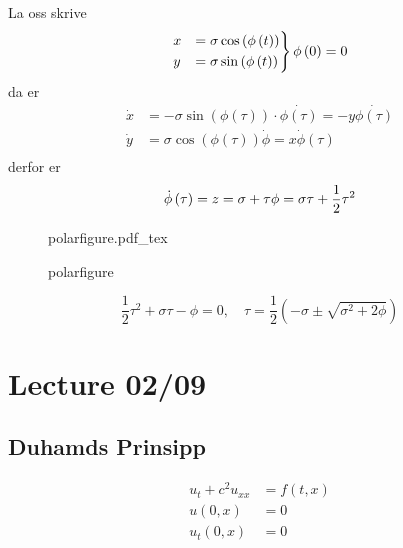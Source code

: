 \documentclass{article}
\newcommand{\incfig}[2][1]{%
\def\svgwidth{#1\columnwidth}
{#2.pdf_tex} } \pdfsuppresswarningpagegroup=1
\theoremstyle{remark}
\newcommand{\newpara}
  {
  \vskip 0.4cm
  }
\begin{document}
  \newpara
  La oss skrive \[
  \begin{split}
    \begin{rcases}
    x &= \sigma  \cos \left( \phi \left( t \right) \right) \\
    y &=  \sigma \sin \left( \phi \left( t \right) \right) \\
    \end{rcases}
    \phi \left( 0 \right) = 0
  \end{split} 
  \] 
  da er \[
  \begin{split}
    \dot{x} &=  -\sigma \sin \left( \phi \left( \tau  \right) \right) \cdot \dot{\phi \left( \tau  \right)} = -y \dot{\phi \left( \tau  \right)} \\
    \dot{y} &= \sigma  \cos \left( \phi \left( \tau  \right) \right) \dot{\phi } = x \dot{\phi }\left( \tau  \right) \\
  \end{split} 
  \] 
  derfor er \[
    \dot{\phi } \left( \tau  \right) =  z = \sigma + \tau \\
    \phi = \sigma \tau  + \frac{1}{2} \tau ^2
  \] 

\begin{figure}[ht]
    \centering
    \incfig{polarfigure}
    \caption{polarfigure}
    \label{fig:polarfigure}
\end{figure}

   \[
   \frac{1}{2} \tau ^2 +  \sigma  \tau  - \phi = 0, \quad \tau = \frac{1}{2} \left( -\sigma \pm\sqrt{\sigma ^2 + 2\phi }  \right) 
   \] 





 \newpage

 \newpage
 \section{Lecture 02/09}%
 \label{sec:lecture_02_09}

 \subsection{Duhamds Prinsipp}%
 \label{sub:duhamds_prinsipp}

 \[
 \begin{split}
   u_{t} + c ^2 u_{xx} &=  f\left( t, x \right) \\
   u\left( 0,x \right) &=  0 \\
   u_{t} \left( 0,x \right) &=  0 \\
 \end{split} 
 \] 
\end{document}
